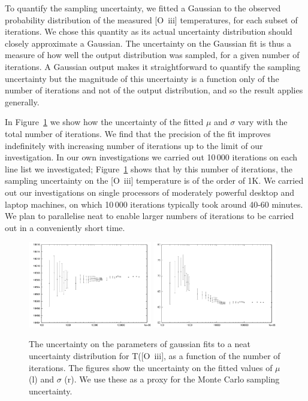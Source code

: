 \documentclass[useAMS,usenatbib]{mn2e}
\begin{document}
To quantify the sampling uncertainty, we fitted a Gaussian to the observed probability distribution of the measured [O~{\sc iii}] temperatures, for each subset of iterations.  We chose this quantity as its actual uncertainty distribution should closely approximate a Gaussian.  The uncertainty on the Gaussian fit is thus a measure of how well the output distribution was sampled, for a given number of iterations.  A Gaussian output makes it straightforward to quantify the sampling uncertainty but the magnitude of this uncertainty is a function only of the number of iterations and not of the output distribution, and so the result applies generally.

In Figure~\ref{samplefigure1} we show how the uncertainty of the fitted $\mu$ and $\sigma$ vary with the total number of iterations.  We find that the precision of the fit improves indefinitely with increasing number of iterations up to the limit of our investigation.  In our own investigations we carried out 10\,000 iterations on each line list we investigated; Figure~\ref{samplefigure1} shows that by this number of iterations, the sampling uncertainty on the [O~{\sc iii}] temperature is of the order of 1K.  We carried out our investigations on single processors of moderately powerful desktop and laptop machines, on which 10\,000 iterations typically took around 40-60 minutes.  We plan to parallelise {\sc neat} to enable larger numbers of iterations to be carried out in a conveniently short time.

\begin{figure}
\includegraphics[width=0.48\textwidth]{figures/mulogx.png}
\includegraphics[width=0.48\textwidth]{figures/sigmalogx.png}
\caption{The uncertainty on the parameters of gaussian fits to a {\sc neat} uncertainty distribution for T([O~{\sc iii}], as a function of the number of iterations.  The figures show the uncertainty on the fitted values of $\mu$ (l) and $\sigma$ (r).  We use these as a proxy for the Monte Carlo sampling uncertainty.}
\label{samplefigure1}
\end{figure}
\end{document}
